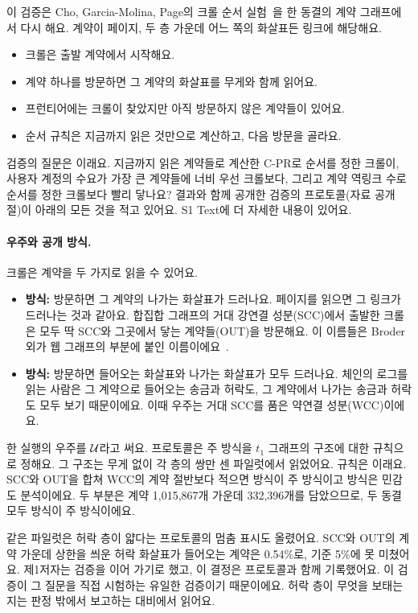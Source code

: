 이 검증은 Cho, Garcia-Molina, Page의 크롤 순서 실험~\cite{cho1998crawling}을 한 동결의 계약 그래프에서 다시 해요. 계약이 페이지, 두 층 가운데 어느 쪽의 화살표든 링크에 해당해요.
\begin{itemize}
\item 크롤은 출발 계약에서 시작해요.
\item 계약 하나를 방문하면 그 계약의 화살표를 무게와 함께 읽어요.
\item 프런티어에는 크롤이 찾았지만 아직 방문하지 않은 계약들이 있어요.
\item 순서 규칙은 지금까지 읽은 것만으로 계산하고, 다음 방문을 골라요.
\end{itemize}
검증의 질문은 이래요. 지금까지 읽은 계약들로 계산한 C-PR로 순서를 정한 크롤이, 사용자 계정의 수요가 가장 큰 계약들에 너비 우선 크롤보다, 그리고 계약 역링크 수로 순서를 정한 크롤보다 빨리 닿나요? 결과와 함께 공개한 검증의 프로토콜(자료 공개 절)이 아래의 모든 것을 적고 있어요. S1 Text에 더 자세한 내용이 있어요.

\paragraph{우주와 공개 방식.}
크롤은 계약을 두 가지로 읽을 수 있어요.
\begin{itemize}
\item \textbf{\outm{} 방식:} 방문하면 그 계약의 나가는 화살표가 드러나요. 페이지를 읽으면 그 링크가 드러나는 것과 같아요. 합집합 그래프의 거대 강연결 성분(SCC)에서 출발한 크롤은 모두 딱 SCC와 그곳에서 닿는 계약들(OUT)을 방문해요. 이 이름들은 Broder 외가 웹 그래프의 부분에 붙인 이름이에요~\cite{broder2000graph}.
\item \textbf{\both{} 방식:} 방문하면 들어오는 화살표와 나가는 화살표가 모두 드러나요. 체인의 로그를 읽는 사람은 그 계약으로 들어오는 송금과 허락도, 그 계약에서 나가는 송금과 허락도 모두 보기 때문이에요. 이때 우주는 거대 SCC를 품은 약연결 성분(WCC)이에요.
\end{itemize}
한 실행의 우주를 $\mathcal{U}$라고 써요. 프로토콜은 주 방식을 $t_1$ 그래프의 구조에 대한 규칙으로 정해요. 그 구조는 무게 없이 각 층의 쌍만 센 파일럿에서 읽었어요. 규칙은 이래요. SCC와 OUT을 합쳐 WCC의 계약 절반보다 적으면 \both{} 방식이 주 방식이고 \outm{} 방식은 민감도 분석이에요. 두 부분은 계약 1,015,867개 가운데 332,396개를 담았으므로, 두 동결 모두 \both{} 방식이 주 방식이에요.

같은 파일럿은 허락 층이 얇다는 프로토콜의 멈춤 표시도 올렸어요. SCC와 OUT의 계약 가운데 상한을 씌운 허락 화살표가 들어오는 계약은 0.54\%로, 기준 5\%에 못 미쳤어요. 제1저자는 검증을 이어 가기로 했고, 이 결정은 프로토콜과 함께 기록했어요. 이 검증이 그 질문을 직접 시험하는 유일한 검증이기 때문이에요. 허락 층이 무엇을 보태는지는 판정 밖에서 보고하는 대비에서 읽어요.

